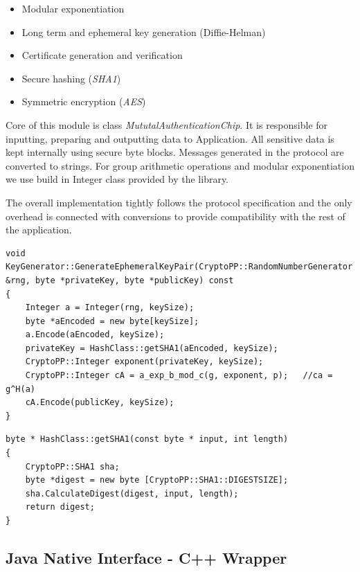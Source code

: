 \documentclass[11pt,titlepage]{article}
\theoremstyle{plain}
\begin{document}
\begin{itemize}
\item Modular exponentiation
\item Long term and ephemeral key generation (Diffie-Helman)
\item Certificate generation and verification
\item Secure hashing (\textit{SHA1})
\item Symmetric encryption (\textit{AES})
\end{itemize}

Core of this module is class \textit{MututalAuthenticationChip}. It is responsible for inputting, preparing and outputting data to Application. All sensitive data is kept internally using secure byte blocks. Messages generated in the protocol are converted to strings.
For group arithmetic operations and modular exponentiation we use build in Integer class provided by the library. 

\vspace{5mm}

The overall implementation tightly follows the protocol specification and the only overhead is connected with conversions to provide compatibility with the rest of the application.
\begin{lstlisting}
void KeyGenerator::GenerateEphemeralKeyPair(CryptoPP::RandomNumberGenerator &rng, byte *privateKey, byte *publicKey) const
{
    Integer a = Integer(rng, keySize);
    byte *aEncoded = new byte[keySize];
    a.Encode(aEncoded, keySize);
    privateKey = HashClass::getSHA1(aEncoded, keySize);
    CryptoPP::Integer exponent(privateKey, keySize);
    CryptoPP::Integer cA = a_exp_b_mod_c(g, exponent, p);   //ca = g^H(a)
    cA.Encode(publicKey, keySize);
}
\end{lstlisting}

\begin{lstlisting}
byte * HashClass::getSHA1(const byte * input, int length)
{
	CryptoPP::SHA1 sha;
	byte *digest = new byte [CryptoPP::SHA1::DIGESTSIZE];
	sha.CalculateDigest(digest, input, length);
	return digest;
}
\end{lstlisting}

\subsection{Java Native Interface - C++ Wrapper}
\end{document}
